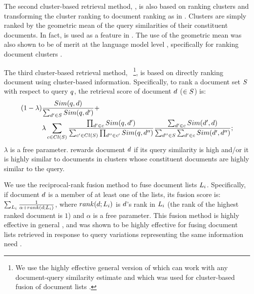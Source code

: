 
The second cluster-based retrieval method, \geoClust \cite{Kurland+Krikon:11a}, is also based on ranking clusters and transforming the cluster ranking to document ranking as in \clustMRF \cite{Raiber+Kurland:13a}. Clusters are simply ranked by the geometric mean of the query similarities of their constituent documents. In fact, \geoClust is used as a feature in \clustMRF. The use of the geometric mean was also shown to be of merit at the language model level \cite{Seo+Croft:10a}, specifically for ranking document clusters \cite{Liu+Croft:08a}.


The third cluster-based retrieval method,
\interp~\cite{Kurland:09a,Kozorovitzky+Kurland:11b}\footnote{We use the highly effective general version of \interp which can work with any document-query similarity estimate and which was used for cluster-based fusion of document lists \cite{Kozorovitzky+Kurland:11b}.}, is based on
directly ranking document using cluster-based
information. Specifically, to rank a document set $S$ with respect to query $q$, the
retrieval score of document $d$ ($\in S$) is:
\begin{align}
  \label{eq:interpf}
(1-\lambda)
&\frac{Sim(q,d)}{\sum_{d' \in S}
  Sim(q,d')} + \\
& \lambda \sum_{c \in Cl(S)}
\frac{\prod_{d' \in c} Sim(q,d')}{\sum_{c' \in Cl(S)} \prod_{d'' \in c'} Sim(q,d'')}  \frac{\sum_{d' \in c} Sim(d',d)}{\sum_{d'' \in S}\sum_{d' \in c} Sim(d',d'')};
\end{align}
$\lambda$ is a free parameter.
\interp rewards document $d$ if its query similarity is high and/or it is highly similar to documents in clusters whose constituent documents are highly similar to the query.



 We use the reciprocal-rank fusion method
\cite{Cormack+al:09a} to fuse document lists
$L_i$. Specifically, if document $d$ is a member of at least
one of the lists, its fusion score is: $\sum_{L_i} \frac{1}{\alpha + rank(d;L_i)}$, where
  $rank(d;L_i)$ is $d$'s rank in $L_i$ (the rank of the highest ranked document is $1$) and
  $\alpha$ is a free parameter. This fusion method is highly effective in general \cite{Anava+al:16a}, and was shown to be highly effective for fusing document lists retrieved in response to query variations representing the same information need \cite{bailey2017retrieval,bc17-adcs}.
